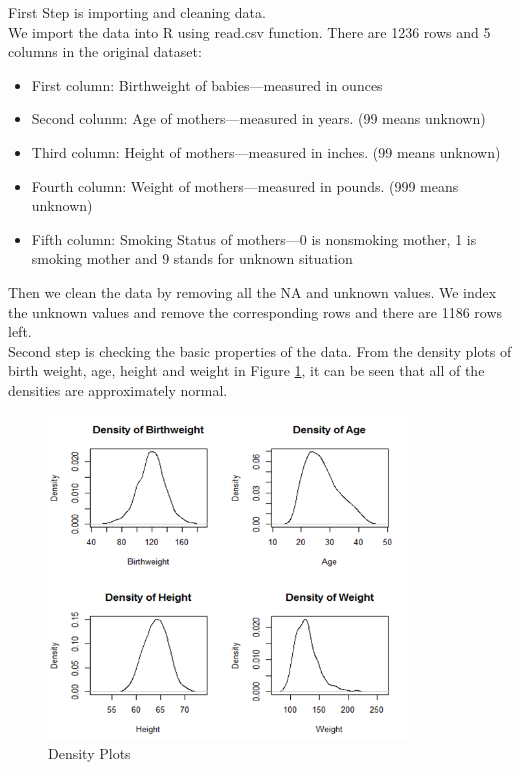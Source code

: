 \documentclass[oneside,12pt]{report}
\begin{document}
First Step is importing and cleaning data.\\
\indent We import the data into R using read.csv function. There are 1236 rows and 5 columns in the original dataset:
\begin{itemize}
    \item First column: Birthweight of babies—measured in ounces
    \item Second colunm: Age of mothers—measured in years. (99 means unknown)
    \item Third column: Height of mothers—measured in inches. (99 means unknown)
    \item Fourth column: Weight of mothers—measured in pounds. (999 means unknown)
    \item Fifth column: Smoking Status of mothers—0 is nonsmoking mother, 1 is smoking mother and 9 stands for unknown situation
\end{itemize}
Then we clean the data by removing all the NA and unknown values. We index the unknown values and remove the corresponding rows and there are 1186 rows left.\\
\indent Second step is checking the basic properties of the data. From the density plots of birth weight, age, height and weight in Figure \ref{fig:densityplot}, it can be seen that all of the densities are approximately normal.
\begin{figure}[htb]
    \begin{center}
        \includegraphics[width=0.85\textwidth]{densityplot.png}
    \end{center}
    \caption{Density Plots}
    \label{fig:densityplot}
\end{figure}
\end{document}
